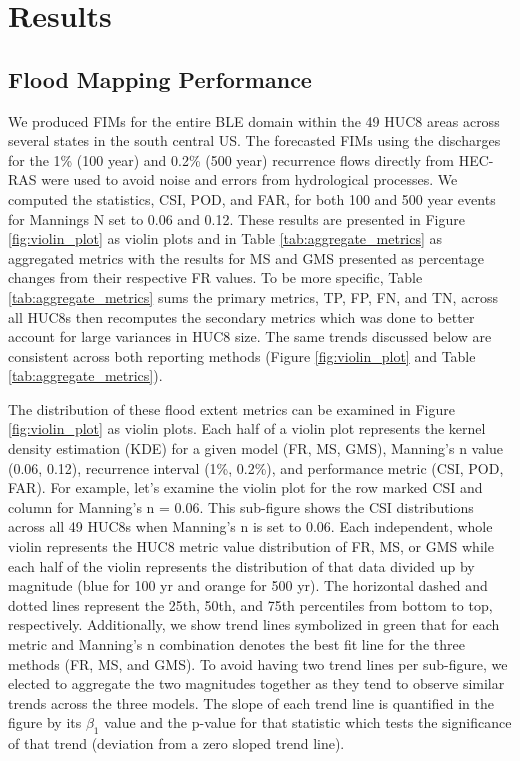 \section{Results}
\label{sec:results}
%
\subsection{Flood Mapping Performance}
\label{ssec:flood_mapping_performance}
%
We produced FIMs for the entire BLE domain within the 49 HUC8 areas across several states in the south central US. 
The forecasted FIMs using the discharges for the 1\% (100 year) and 0.2\% (500 year) recurrence flows directly from HEC-RAS were used to avoid noise and errors from hydrological processes.
We computed the statistics, CSI, POD, and FAR, for both 100 and 500 year events for Mannings N set to 0.06 and 0.12.
These results are presented in Figure \ref{fig:violin_plot} as violin plots and in Table \ref{tab:aggregate_metrics} as aggregated metrics with the results for MS and GMS presented as percentage changes from their respective FR values.
To be more specific, Table \ref{tab:aggregate_metrics} sums the primary metrics, TP, FP, FN, and TN, across all HUC8s then recomputes the secondary metrics which was done to better account for large variances in HUC8 size.
The same trends discussed below are consistent across both reporting methods (Figure \ref{fig:violin_plot} and Table \ref{tab:aggregate_metrics}).

The distribution of these flood extent metrics can be examined in Figure \ref{fig:violin_plot} as violin plots.
Each half of a violin plot represents the kernel density estimation (KDE) for a given model (FR, MS, GMS), Manning's n value (0.06, 0.12), recurrence interval (1\%, 0.2\%), and performance metric (CSI, POD, FAR).
For example, let's examine the violin plot for the row marked CSI and column for Manning's n = 0.06.
This sub-figure shows the CSI distributions across all 49 HUC8s when Manning's n is set to 0.06.
Each independent, whole violin represents the HUC8 metric value distribution of FR, MS, or GMS while each half of the violin represents the distribution of that data divided up by magnitude (blue for 100 yr and orange for 500 yr).
The horizontal dashed and dotted lines represent the 25th, 50th, and 75th percentiles from bottom to top, respectively.
Additionally, we show trend lines symbolized in green that for each metric and Manning's n combination denotes the best fit line for the three methods (FR, MS, and GMS).
To avoid having two trend lines per sub-figure, we elected to aggregate the two magnitudes together as they tend to observe similar trends across the three models.
The slope of each trend line is quantified in the figure by its $\beta_1$ value and the p-value for that statistic which tests the significance of that trend (deviation from a zero sloped trend line).

